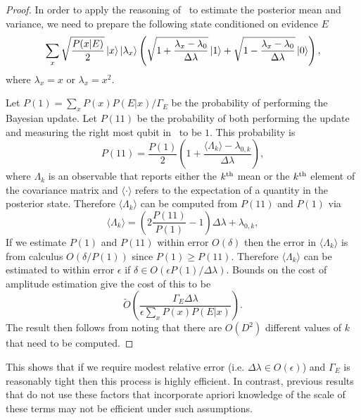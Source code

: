 \documentclass[aps,amsmath,onecolumn,amssymb]{revtex4}
\begin{document}
\begin{proof}
In order to apply the reasoning of~ to estimate the posterior mean and variance, we need to prepare the following state conditioned on evidence $E$
\begin{equation}
\sum_{x} \sqrt{\frac{P(x|E)}{2}} \left|x\right\rangle\left|\lambda_x\right\rangle\left(\sqrt{1+\frac{\lambda_x-\lambda_0 }{\Delta \lambda}}\left|1\right\rangle + \sqrt{1-\frac{\lambda_x-\lambda_0 }{\Delta \lambda}}\left|0\right\rangle \right),\label{eq:hadtest2}
\end{equation}
where $\lambda_x =x$ or $\lambda_x =x^2$.

Let $P(1)= \sum_x P(x) P(E|x)/\Gamma_E$ be the probability of performing the Bayesian update.  Let $P(11)$ be the probability of both performing the update and measuring the right most qubit in~ to be $1$.  This probability is
\begin{equation}
P(11) = \frac{P(1)}{2}\left(1+\frac{\langle \Lambda_k \rangle -\lambda_{0,k}}{\Delta \lambda} \right),
\end{equation}
where $\Lambda_k$ is an observable that reports either the $k^{\rm th}$ mean or the $k^{\rm th}$ element of the covariance matrix and $\langle \cdot \rangle$ refers to the expectation of a quantity in the posterior state.
Therefore $\langle \Lambda_k \rangle$ can be computed from $P(11)$ and $P(1)$ via
\begin{equation}
\langle \Lambda_k \rangle = \left(2\frac{P(11)}{P(1)}-1 \right)\Delta \lambda + \lambda_{0,k},
\end{equation}
If we estimate $P(1)$ and $P(11)$ within error $O(\delta)$ then the error in $\langle \Lambda_k \rangle$ is from calculus $O(\delta/P(1))$ since $P(1)\ge P(11)$.  Therefore $\langle \Lambda_k \rangle$ can be estimated to within error $\epsilon$ if $\delta \in O(\epsilon P(1) /\Delta \lambda)$.  Bounds on the cost of amplitude estimation give the cost of this to be~\cite{BHM+02}
\begin{equation}
\tilde{O} \left(\frac{\Gamma_E \Delta \lambda}{\epsilon \sum_x P(x) P(E|x)} \right).
\end{equation}
The result then follows from noting that there are $O(D^2)$ different values of $k$ that need to be computed.
\end{proof}
This shows that if we require modest relative error (i.e. $\Delta \lambda \in O(\epsilon)$) and $\Gamma_E$ is reasonably tight then this process is highly efficient.  In contrast, previous results that do not use these factors that incorporate apriori knowledge of the scale of these terms may not be efficient under such assumptions.
\end{document}
